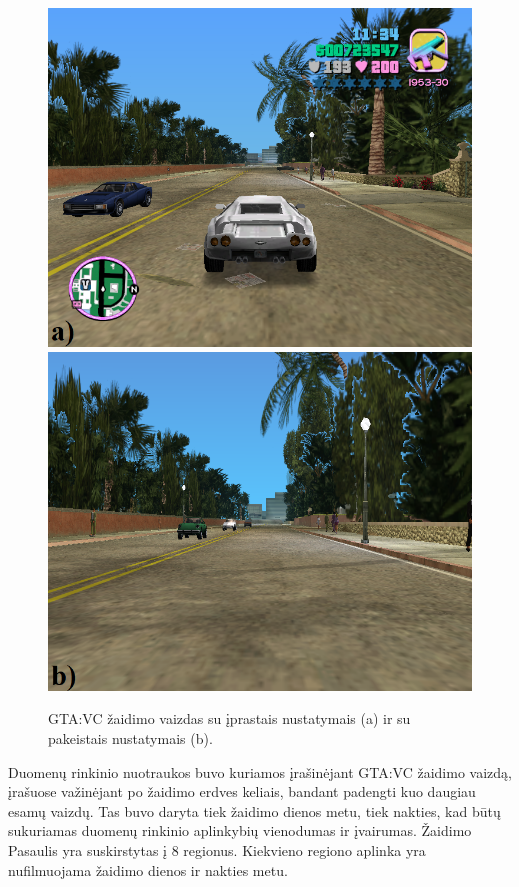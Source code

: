 \documentclass{VUMIFPSkursinis}
\begin{document}
            \begin{figure}[H]
                \centering
                \includegraphics[scale=0.45]{img/neapdorotas_pvz}
                \includegraphics[scale=0.45]{img/apdorotas_pvz}
                \caption{GTA:VC žaidimo vaizdas su įprastais nustatymais (a) ir su pakeistais nustatymais (b).}
                \label{img:mlp}
            \end{figure}

            Duomenų rinkinio nuotraukos buvo kuriamos įrašinėjant GTA:VC žaidimo vaizdą, įrašuose važinėjant po žaidimo erdves keliais, bandant padengti kuo daugiau esamų vaizdų. Tas buvo daryta tiek žaidimo dienos metu, tiek nakties, kad būtų sukuriamas duomenų rinkinio aplinkybių vienodumas ir įvairumas. Žaidimo Pasaulis yra suskirstytas į 8 regionus. Kiekvieno regiono aplinka yra nufilmuojama žaidimo dienos ir nakties metu.
            
\end{document}
